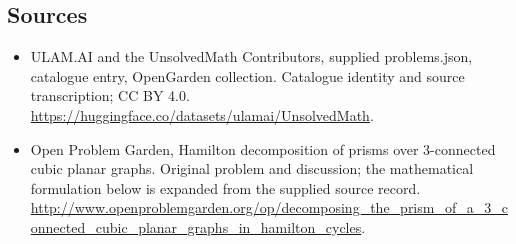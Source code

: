 \documentclass[11pt,a4paper]{article}
\begin{document}
\subsection{Sources}
\begin{itemize}
\item[S1] ULAM.AI and the UnsolvedMath Contributors, supplied problems.json, catalogue entry, OpenGarden collection. Catalogue identity and source transcription; CC BY 4.0.
\url{https://huggingface.co/datasets/ulamai/UnsolvedMath}.
\item[S2] Open Problem Garden, Hamilton decomposition of prisms over 3-connected cubic planar graphs. Original problem and discussion; the mathematical formulation below is expanded from the supplied source record.
\url{http://www.openproblemgarden.org/op/decomposing_the_prism_of_a_3_connected_cubic_planar_graphs_in_hamilton_cycles}.

\end{itemize}
\end{document}
